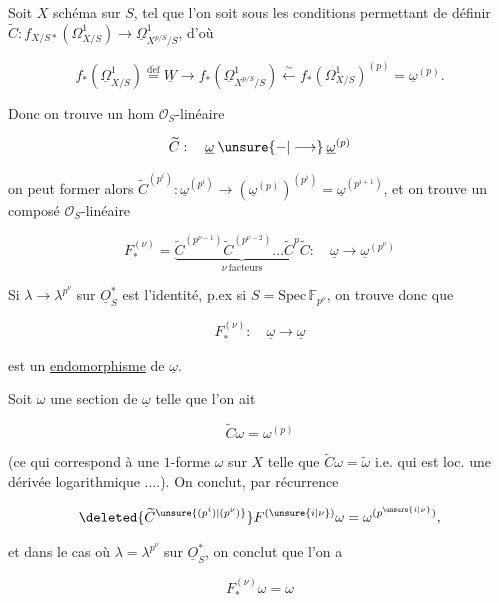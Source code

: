 
Soit $X$ schéma sur $S$, tel que l'on soit sous les conditions permettant de définir $\widetilde C:f_{X/S*}(\Omega^1_{X/S})\longrightarrow\underline{\Omega}^1_{X^{p/S}/S}$, d'où


\[
 f_*(\underline\Omega^1_{X/S})\overset{\mathrm{d\acute ef}}{=}\underline W\longrightarrow
 f_*(\underline\Omega^1_{X^{p/S}/S})\stackrel{\sim}{\longleftarrow}
 f_*(\Omega^1_{X/S})^{(p)}=\underline\omega^{(p)}.
\]



Donc on trouve un hom $\mathcal O_S$-linéaire

\[
\widetilde C:\quad\underline\omega\mathbin{\unsure{-|\longrightarrow}}\underline\omega^{(p)}
\]

on peut former alors $\widetilde C^{(p^i)}:\underline\omega^{(p^i)}\longrightarrow(\underline\omega^{(p)})^{(p^i)}=\underline\omega^{(p^{i+1})}$, et on trouve un composé $\mathcal O_S$-linéaire

\[
F_*^{(\nu)}=\underbrace{\widetilde C^{(p^{\nu-1})}\widetilde C^{(p^{\nu-2})}\ldots
\widetilde C^{p}\widetilde C}_{\nu\ \text{facteurs}}:
\quad\underline\omega\longrightarrow\underline\omega^{(p^\nu)}
\]

Si $\lambda\longrightarrow\lambda^{p^\nu}$ sur $\underline O_S^{*}$ est l'identité, p.ex si $S=\mathrm{Spec}\,\mathbb F_{p^\nu}$, on trouve donc que 

\[
F_*^{(\nu)}:\quad\underline\omega\longrightarrow\underline\omega
\]

est un \uline{endomorphisme}  de $\underline\omega$.

Soit $\omega$ une section de $\underline\omega$ telle que l'on ait

\[
\widetilde C\omega=\omega^{(p)}
\]

(ce qui correspond à une  $1$-forme $\omega$ sur $X$ telle que $\widetilde C\omega=\widetilde\omega$ i.e. qui est loc. une dérivée logarithmique ....). On conclut, par récurrence

\[
\deleted{\widetilde C^{\unsure{(p^i)|(p^\nu)}}}F^{(\unsure{i|\nu})}\omega=\omega^{(p^{\unsure{i|\nu}})},
\]

et dans le cas où $\lambda=\lambda^{p^\nu}$ sur $\underline O_S^{*}$, on conclut que l'on a

\[
\boxed{F_*^{(\nu)}\omega=\omega}
\]

